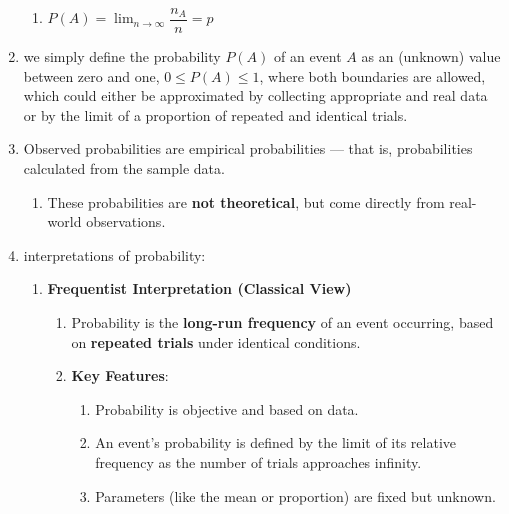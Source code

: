 \begin{enumerate}
\begin{enumerate}
        \item $P(A) =\displaystyle \lim_{n\to \infty} \dfrac{n_A}{n} = p$
        \hfill \cite{statistics/book/Statistics-for-Data-Scientists/Maurits-Kaptein}
    \end{enumerate}

    \item we simply define the probability $P(A)$ of an event $A$ as an (unknown) value between zero and one, $0 \leq P (A) \leq 1$, where both boundaries are allowed, which could either be approximated by collecting appropriate and real data or by the limit of a proportion of repeated and identical trials.
    \hfill \cite{statistics/book/Statistics-for-Data-Scientists/Maurits-Kaptein}

    \item
    \begin{definition}
        Observed probabilities are empirical probabilities — that is, probabilities calculated from the sample data.
    \end{definition}
    \begin{enumerate}
        \item These probabilities are \textbf{not theoretical}, but come directly from real-world observations.
    \end{enumerate}

    \item interpretations of probability:
    \begin{enumerate}
        \item \textbf{Frequentist Interpretation (Classical View)}
        \begin{enumerate}
            \item Probability is the \textbf{long-run frequency} of an event occurring, based on \textbf{repeated trials} under identical conditions.

            \item \textbf{Key Features}:
            \begin{enumerate}
                \item Probability is objective and based on data.

                \item An event's probability is defined by the limit of its relative frequency as the number of trials approaches infinity.

                \item Parameters (like the mean or proportion) are fixed but unknown.


\end{enumerate}
\end{enumerate}
\end{enumerate}
\end{enumerate}
